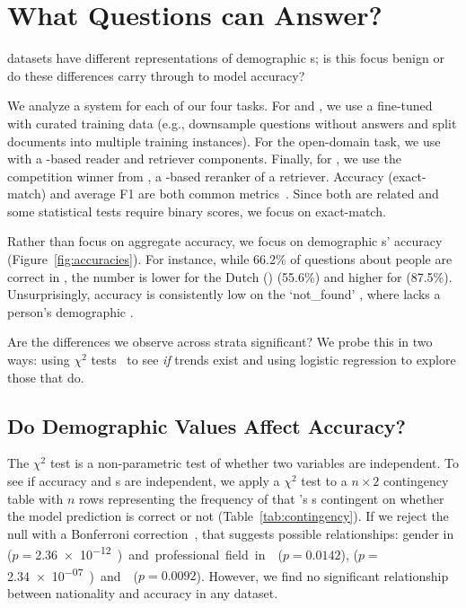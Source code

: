 \section{What Questions can  Answer?}
\label{sec:accuracy}

\qa{} datasets have different representations of demographic \democol{}s; 
is this focus benign or do these differences carry through to model accuracy?

We analyze a  system for each of our four tasks.
For \nq{} and \squad{}, we use a fine-tuned \bert{}~\cite{alberti2019bert} with curated training data (e.g., downsample questions without answers and split documents into multiple training instances). For the open-domain \triviaqa{} task, we use ~\cite{lee2019latent} with a \bert{}-based reader and retriever components. Finally, for \qb{}, we use the competition winner from \citet{wallace-19}, a -based reranker of a  retriever.
Accuracy (exact-match) and average F1 are both common  metrics~\cite{rajpurkar-16}. Since both are related and some statistical tests require binary scores, we focus on exact-match.

Rather than focus on aggregate accuracy, we focus on demographic \demosubset{}s' accuracy (Figure~\ref{fig:accuracies}). 
For instance, while 66.2\% of questions about people are correct in \qb{}, the number is lower for the Dutch () (55.6\%) and higher for   (87.5\%).
Unsurprisingly, accuracy is consistently low on the `not\_found' \demosubset{}, where \wikidata{} lacks a person's demographic \demorow{}.

Are the differences we observe across strata significant?
We probe this in two ways: using $\chi^2$ tests~\cite{plackett1983karl} to see \emph{if} trends exist and using logistic regression to explore those that do.

\subsection{Do Demographic Values Affect Accuracy?}
\label{subsec:chi-squared-test}
The $\chi^2$ test is a non-parametric test of whether two variables are independent. 
To see if accuracy and \democol{}s are independent, we apply a $\chi^2$ test to a $n \times 2$ contingency table with $n$ rows representing the frequency of that \democol{}'s \demosubset{}s contingent on whether the model prediction is correct or not (Table~\ref{tab:contingency}).
If we reject the null with a Bonferroni correction~\cite[divide the $p$-value threshold by three, as we have multiple tests for each dataset]{holm-79}, that suggests possible relationships:
gender in \nq{} ($p=$\SI{2.36e-12}) and professional field in \nq{} ($p=0.0142$), \qb{} ($p=$\SI{2.34e-07}) and \triviaqa{} ($p=0.0092$). 
However, we find no significant relationship between nationality and accuracy in any dataset.

